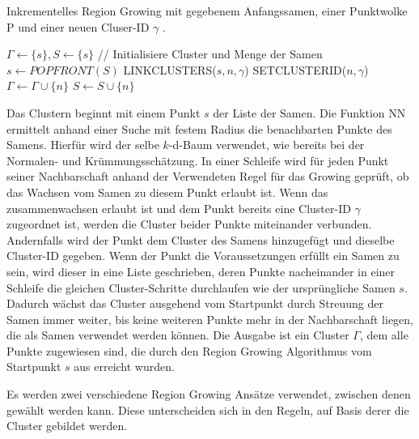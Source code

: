 \begin{algorithm}
	\caption{Inkrementelles Region Growing mit gegebenem Anfangssamen, einer Punktwolke P und einer neuen Cluser-ID $ \gamma $ \cite{Dube2018}.}
	\label{Segmentierung}
	\begin{algorithmic}[1]
			\State $ \Gamma \leftarrow \{s\}, S \leftarrow \{s\} $ // Initialisiere Cluster und Menge der Samen
				\State $ s \leftarrow POPFRONT(S) $
							\State LINKCLUSTERS($ s,n,\gamma $)
						\Else
							\State SETCLUSTERID($ n,\gamma $)
							\State $ \Gamma \leftarrow \Gamma \cup \{n\} $
								\State $ S \leftarrow S \cup \{n\} $
							\EndIf
						\EndIf
					\EndIf
				\EndFor
			\EndWhile 
			\State \Return{$ \Gamma $}
		\EndFunction
	\end{algorithmic}
\end{algorithm}

Das Clustern beginnt mit einem Punkt $ s $ der Liste der Samen. Die Funktion NN ermittelt anhand einer Suche mit festem Radius die benachbarten Punkte des Samens. Hierfür wird der selbe $k$-d-Baum verwendet, wie bereits bei der Normalen- und Krümmungsschätzung. In einer Schleife wird für jeden Punkt seiner Nachbarschaft anhand der Verwendeten Regel für das Growing geprüft, ob das Wachsen vom Samen zu diesem Punkt erlaubt ist. Wenn das zusammenwachsen erlaubt ist und dem Punkt bereits eine Cluster-ID $ \gamma $ zugeordnet ist, werden die Cluster beider Punkte miteinander verbunden. Andernfalls wird der Punkt dem Cluster des Samens hinzugefügt und dieselbe Cluster-ID gegeben. Wenn der Punkt die Voraussetzungen erfüllt ein Samen zu sein, wird dieser in eine Liste geschrieben, deren Punkte nacheinander in einer Schleife die gleichen Cluster-Schritte durchlaufen wie der ursprüngliche Samen $ s$. Dadurch wächst das Cluster ausgehend vom Startpunkt durch Streuung der Samen immer weiter, bis keine weiteren Punkte mehr in der Nachbarschaft liegen, die als Samen verwendet werden können. Die Ausgabe ist ein Cluster $ \Gamma $, dem alle Punkte zugewiesen sind, die durch den Region Growing Algorithmus vom Startpunkt $ s $ aus erreicht wurden. 

Es werden zwei verschiedene Region Growing Ansätze verwendet, zwischen denen gewählt werden kann. Diese unterscheiden sich in den  Regeln, auf Basis derer die Cluster gebildet werden. 

